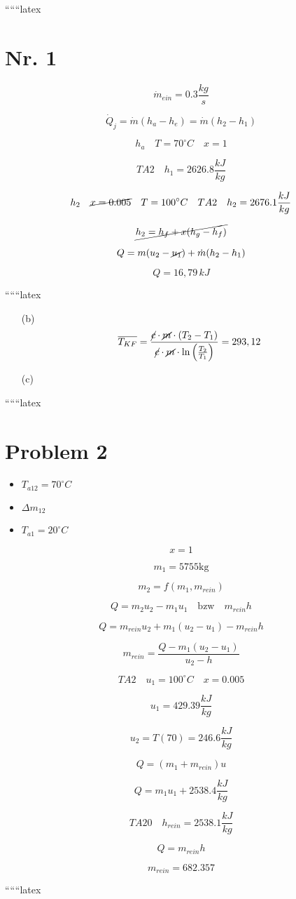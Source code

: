 
``````latex

\section*{Nr. 1}

\[
\dot{m}_{ein} = 0.3 \frac{kg}{s}
\]

\[
\dot{Q}_j = \dot{m} (h_a - h_e) = \dot{m} (h_2 - h_1)
\]

\[
h_a \quad T = 70^\circ C \quad x = 1
\]

\[
TA2 \quad h_1 = 2626.8 \frac{kJ}{kg}
\]

\[
h_2 \quad \cancel{x = 0.005} \quad T = 100^\circ C \quad TA2 \quad h_2 = 2676.1 \frac{kJ}{kg}
\]

\[
\cancel{h_2 = h_f + x (h_g - h_f)}
\]

\[
Q = m (u_2 - \cancel{u_1}) + \dot{m} (h_2 - h_1)
\]

\[
Q = 16,79 \, kJ
\]

``````latex

\begin{itemize}
    \item[(b)] 
    \[
    \overline{T_{KF}} = \frac{\cancel{c} \cdot \cancel{m} \cdot (T_2 - T_1)}{\cancel{c} \cdot \cancel{m} \cdot \ln \left( \frac{T_2}{T_1} \right)} = 293,12
    \]
    \item[(c)] 
\end{itemize}

``````latex


\section*{Problem 2}

\begin{itemize}
    \item $T_{a12} = 70^\circ C$
    \item $\Delta m_{12}$
    \item $T_{a1} = 20^\circ C$
\end{itemize}

\[
x = 1
\]

\[
m_1 = 5755 \text{kg}
\]

\[
m_2 = f(m_1, m_{rein})
\]

\[
Q = m_2 u_2 - m_1 u_1 \quad \text{bzw} \quad m_{rein} h
\]

\[
Q = m_{rein} u_2 + m_1 (u_2 - u_1) - m_{rein} h
\]

\[
m_{rein} = \frac{Q - m_1 (u_2 - u_1)}{u_2 - h}
\]

\[
TA2 \quad u_1 = 100^\circ C \quad x = 0.005
\]

\[
u_1 = 429.39 \frac{kJ}{kg}
\]

\[
u_2 = T(70) = 246.6 \frac{kJ}{kg}
\]

\[
Q = (m_1 + m_{rein}) u
\]

\[
Q = m_1 u_1 + 2538.4 \frac{kJ}{kg}
\]

\[
TA20 \quad h_{rein} = 2538.1 \frac{kJ}{kg}
\]

\[
Q = m_{rein} h
\]

\[
m_{rein} = 682.357
\]

``````latex


